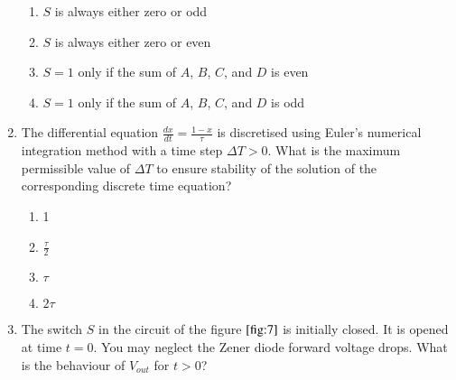 \documentclass[journal]{IEEEtran}
\numberwithin{equation}{enumi}
\numberwithin{figure}{enumi}
\begin{document}
\begin{enumerate}
\begin{enumerate}
    \item $S$ is always either zero or odd
    \item $S$ is always either zero or even
    \item $S = 1$ only if the sum of $A$, $B$, $C$, and $D$ is even
    \item $S = 1$ only if the sum of $A$, $B$, $C$, and $D$ is odd
\end{enumerate}
    \bigskip
    \item The differential equation $\frac{dx}{dt} = \frac{1 - x}{\tau}$ is discretised using Euler's numerical integration method with a time step $\Delta T > 0$. What is the maximum permissible value of $\Delta T$ to ensure stability of the solution of the corresponding discrete time equation?
    \begin{multicols}{4}
    \begin{enumerate}
        \item 1
        \item $\frac{\tau}{2}$
        \item $\tau$
        \item $2\tau$
    \end{enumerate}
    \end{multicols}
    \bigskip
    \item The switch $S$ in the circuit of the figure $\ref{fig:7}$ is initially closed. It is opened at time $t = 0$. You may neglect the Zener diode forward voltage drops. What is the behaviour of $V_{out}$ for $t > 0$?
    \begin{figure}[H]
\centering
{}
\end{figure}
\end{enumerate}
\end{document}
